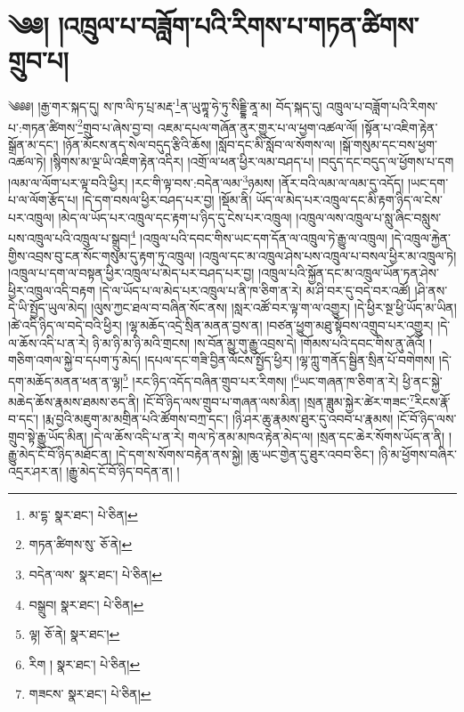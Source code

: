 \setcounter{footnote}{0} 
\chapter{༄༅། །འཁྲུལ་པ་བཟློག་པའི་རིགས་པ་གཏན་ཚིགས་གྲུབ་པ།}༄༅༅། །རྒྱ་གར་སྐད་དུ། ས་ཁ་ལི་ཏ་པྲ་མརྡ་\footnote{མ་དྷ་  སྣར་ཐང་།  པེ་ཅིན། }ན་ཡུཀྟཱ་ཧེ་ཏུ་སིདྡྷི་ནཱ་མ། བོད་སྐད་དུ། འཁྲུལ་པ་བཟློག་པའི་རིགས་པ་:གཏན་ཚིགས་\footnote{གཏན་ཚིགས་སུ་  ཅོ་ནེ། }གྲུབ་པ་ཞེས་བྱ་བ། འཇམ་དཔལ་གཞོན་ནུར་གྱུར་པ་ལ་ཕྱག་འཚལ་ལོ། །སྟོན་པ་འཇིག་རྟེན་སྒྲོན་མ་དང་། །ཉོན་མོངས་ནད་སེལ་བདུད་རྩིའི་ཆོས། །སློབ་དང་མི་སློབ་ལ་སོགས་ལ། །སྒོ་གསུམ་དང་བས་ཕྱག་འཚལ་ཏེ། །སྙིགས་མ་ལྔ་ཡི་འཇིག་རྟེན་འདིར། །འགྲོ་ལ་ཕན་ཕྱིར་ལམ་བཤད་པ། །བདུད་དང་བདུད་ལ་ཕྱོགས་པ་དག །ལམ་ལ་ལོག་པར་ལྟ་བའི་ཕྱིར། །རང་གི་ལྟ་བས་:བདེན་ལམ་\footnote{བདེན་ལས་  སྣར་ཐང་།  པེ་ཅིན། }ཉམས། །ནོར་བའི་ལམ་ལ་ལམ་དུ་འདོད། །ཡང་དག་པ་ལ་ལོག་རྩོད་པ། །དེ་དག་བསལ་ཕྱིར་བཤད་པར་བྱ། །སྡོམ་ནི། ཡོད་ལ་མེད་པར་འཁྲུལ་དང་མི་རྟག་ཉིད་ལ་ངེས་པར་འཁྲུལ། །མེད་ལ་ཡོད་པར་འཁྲུལ་དང་རྟག་པ་ཉིད་དུ་ངེས་པར་འཁྲུལ། །འཁྲུལ་ལས་འཁྲུལ་པ་སླུ་ཞིང་བསླུས་པས་འཁྲུལ་པའི་འཁྲུལ་པ་སྒྲུབ།\footnote{བསྒྲུབ།  སྣར་ཐང་།  པེ་ཅིན། } །འཁྲུལ་པའི་དབང་གིས་ཡང་དག་དོན་ལ་འཁྲུལ་ཏེ་རྒྱུ་ལ་འཁྲུལ། །དེ་འཁྲུལ་རྐྱེན་གྱིས་འབྲས་བུ་ངན་སོང་གསུམ་དུ་རྟག་ཏུ་འཁྲུལ། །འཁྲུལ་དང་མ་འཁྲུལ་ཤེས་པས་འཁྲུལ་པ་བསལ་ཕྱིར་མ་འཁྲུལ་ཏེ། །འཁྲུལ་པ་དག་ལ་བསྟན་ཕྱིར་འཁྲུལ་པ་མེད་པར་བཤད་པར་བྱ། །འཁྲུལ་པའི་སྐྱོན་དང་མ་འཁྲུལ་ཡོན་ཏན་ཤེས་ཕྱིར་འཁྲུལ་འདི་བརྟག །དེ་ལ་ཡོད་པ་ལ་མེད་པར་འཁྲུལ་པ་ནི་ཁ་ཅིག་ན་རེ། མ་ཤི་བར་དུ་བདེ་བར་འཚོ། །ཤི་ནས་དེ་ཡི་སྤྱོད་ཡུལ་མེད། །ལུས་ཀྱང་ཐལ་བ་བཞིན་སོང་ནས། །སླར་འཚོ་བར་ལྟ་ག་ལ་འགྱུར། །དེ་ཕྱིར་སྔ་ཕྱི་ཡོད་མ་ཡིན། །ཚེ་འདི་ཉིད་ལ་བདེ་བའི་ཕྱིར། །ལྷ་མཆོད་འདྲེ་སྲིན་མནན་བྱས་ན། །བཙན་ཕྱུག་མཐུ་སྟོབས་འགྲུབ་པར་འགྱུར། །དེ་ལ་ཆོས་འདི་པ་ན་རེ། ཉི་མ་ཉི་མ་ཉི་མའི་གྲངས། །ས་བོན་མྱུ་གུ་རྒྱུ་འབྲས་དེ། །གོམས་པའི་དབང་གིས་ནུ་ཞོའོ། །གཅིག་འགལ་སྐྱེ་བ་དཔག་ཏུ་མེད། །དཔལ་དང་གཟི་བྱིན་ལོངས་སྤྱོད་ཕྱིར། །ལྷ་ཀླུ་གནོད་སྦྱིན་སྲིན་པོ་བགེགས། །དེ་དག་མཆོད་མནན་ཕན་ན་ལྷ།\footnote{ལྟ།  ཅོ་ནེ།  སྣར་ཐང་། } །རང་ཉིད་འདོད་བཞིན་གྲུབ་པར་རིགས། །\footnote{རིག །  སྣར་ཐང་།  པེ་ཅིན། }ཡང་གཞན་ཁ་ཅིག་ན་རེ། ཕྱི་ནང་སྐྱེ་མཆེད་ཆོས་རྣམས་ཐམས་ཅད་ནི། །ངོ་བོ་ཉིད་ལས་གྲུབ་པ་གཞན་ལས་མིན། །སྲན་ཟླུམ་སྐྱེར་ཚེར་གཟང་\footnote{གཟངས་  སྣར་ཐང་།  པེ་ཅིན། }རིངས་རྣོ་བ་དང་། །རྨ་བྱའི་མཇུག་མ་མགྲིན་པའི་ཚོགས་བཀྲ་དང་། །ཉི་ཤར་ཆུ་རྣམས་ཐུར་དུ་འབབ་པ་རྣམས། །ངོ་བོ་ཉིད་ལས་གྲུབ་སྟེ་རྒྱུ་ཡོད་མིན། །དེ་ལ་ཆོས་འདི་པ་ན་རེ། གལ་ཏེ་ནམ་མཁའ་རྟེན་མེད་ལ། །སྲན་དང་ཆེར་སོགས་ཡོད་ན་ནི། །རྒྱུ་མེད་ངོ་བོ་ཉིད་མཐོང་ན། །དེ་དག་ས་སོགས་བརྟེན་ནས་སྐྱེ། །ཆུ་ཡང་གྱེན་དུ་ཐུར་འབབ་ཅིང་། །ཉི་མ་ཕྱོགས་བཞིར་འདྲར་ཤར་ན། །རྒྱུ་མེད་ངོ་བོ་ཉིད་བདེན་ན། །

